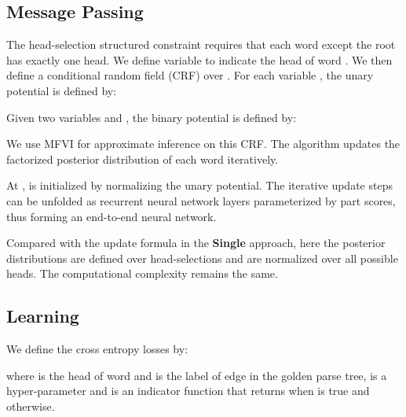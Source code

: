 \documentclass[11pt,a4paper]{article}
\begin{document}
\subsection{Message Passing}
The head-selection structured constraint requires that each word except the root has exactly one head.
We define variable  to indicate the head of word . We then define a conditional random field (CRF) over . For each variable , the unary potential is defined by:

Given two variables  and , the binary potential is defined by:

We use MFVI for approximate inference on this CRF. The algorithm updates the factorized posterior distribution  of each word iteratively.

At ,  is initialized by normalizing the unary potential.
The iterative update steps can be unfolded as recurrent neural network layers parameterized by part scores, thus forming an end-to-end neural network. 

Compared with the update formula in the \textbf{Single} approach, here the posterior distributions are defined over head-selections and are normalized over all possible heads. The computational complexity remains the same.

\subsection{Learning}
\label{sec:loss}
We define the cross entropy losses by:

where  is the head of word  and  is the label of edge  in the golden parse tree,  is a hyper-parameter and  is an indicator function that returns  when  is true and  otherwise. 
\end{document}
